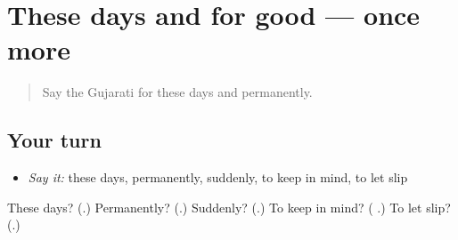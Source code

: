 \section[(dialogue)]{These days and for good — once more}

\label{lesson:GU-R182-review-final-182}



\begin{quote}
Say the Gujarati for these days and permanently.
\end{quote}

\subsection*{Your turn}
\begin{itemize}
\raggedright
  \item \emph{Say it:} these days, permanently, suddenly, to keep in mind, to let slip
\end{itemize}

\begin{tcolorbox}[breakable,colback=teal!4,colframe=teal!35!black,title={Before you move on}]
These days? (\textbf{}.) Permanently? (\textbf{}.) Suddenly? (\textbf{}.) To keep in mind? (\textbf{ }.) To let slip? (\textbf{}.)
\end{tcolorbox}
